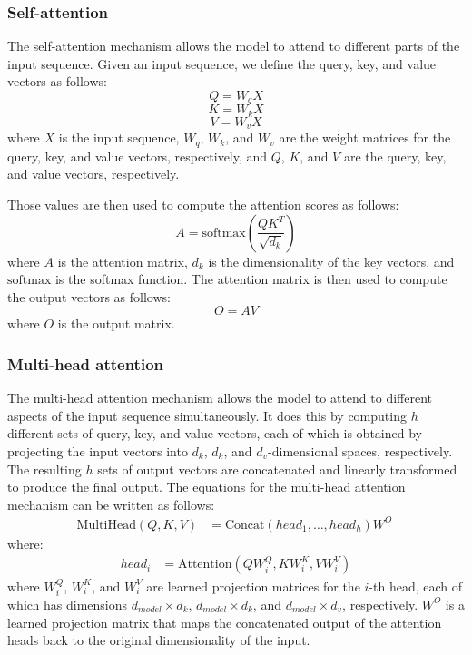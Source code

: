 \documentclass[a4paper]{sapthesis}
\begin{document}
\subsubsection{Self-attention}
The self-attention mechanism allows the model to 
attend to different parts of the input sequence. Given an input sequence,
we define the query, key, and value vectors as follows:
\begin{equation}
  Q = W_{q}X
  \end{equation}
\begin{equation}
  K = W_{k}X
  \end{equation}
\begin{equation}
  V = W_{v}X
  \end{equation}
where $X$ is the input sequence, $W_q$, $W_k$, and $W_v$ are the weight
  matrices for the query, key, and value vectors, respectively, and $Q$,
  $K$, and $V$ are the query, key, and value vectors, respectively. 
  
  Those values are then used to compute the attention scores as follows:
  \begin{equation}
    A = \text{softmax}\left(\frac{QK^T}{\sqrt{d_k}}\right)
    \end{equation}
where $A$ is the attention matrix, $d_k$ is the dimensionality of the
  key vectors, and $\text{softmax}$ is the softmax function. The 
  attention matrix is then used to compute the output vectors as follows:
  \begin{equation}
    O = AV
    \end{equation}
where $O$ is the output matrix. 
\subsubsection{Multi-head attention}
The multi-head attention mechanism allows the model to attend to different
 aspects of the input sequence simultaneously. It does this by 
computing $h$ different sets of query, key, and value vectors,
each of which is obtained by projecting the input vectors into
$d_k$, $d_k$, and $d_v$-dimensional spaces, respectively. 
The resulting $h$ sets of output vectors are concatenated
 and linearly transformed to produce the final output.\newline
 The equations for the multi-head attention mechanism can be written as 
 follows:
 \begin{align*}
 \text{MultiHead}(Q,K,V) &= \text{Concat}(head_1,\ldots,head_h)W^O \
\end{align*}
where:
 \begin{align*}
   head_i &= \text{Attention}(QW_i^Q, KW_i^K, VW_i^V)
 \end{align*}
 where $W_i^Q$, $W_i^K$, and $W_i^V$ are learned projection matrices for
  the $i$-th head, each of which has dimensions $d_{model}\times d_k$,
   $d_{model}\times d_k$, and $d_{model}\times d_v$, respectively.
    $W^O$ is a learned projection matrix that maps the concatenated
 output of the attention heads back to the original dimensionality of
  the input.
\end{document}
